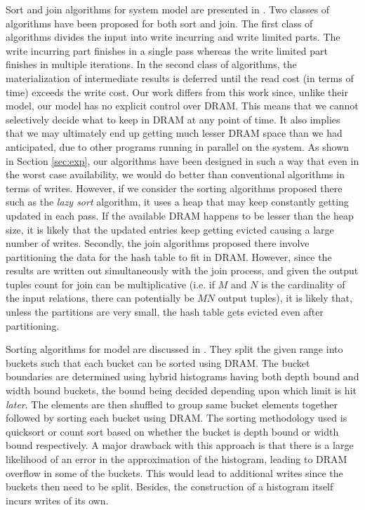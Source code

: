 Sort and join algorithms for system model \modelExplicit{} are presented in \cite{viglas}. Two classes of algorithms have been proposed for both sort and join. The first class of algorithms divides the input into write incurring and write limited parts. The write incurring part finishes in a single pass whereas the write limited part finishes in  multiple iterations. In the second class of algorithms, the materialization of intermediate results is deferred until the read cost (in terms of time) exceeds the write cost. Our work differs from this work since, unlike their model, our model has no explicit control over DRAM. This means that we cannot selectively decide what to keep in DRAM at any point of time. It also implies that we may ultimately end up getting much lesser DRAM space than we had anticipated, due to other programs running in parallel on the system. As shown in Section \ref{sec:exp}, our algorithms have been designed in such a way that even in the worst case availability, we would do better than conventional algorithms in terms of writes. However, if we consider the sorting algorithms proposed there such as the \textit{lazy sort} algorithm, it uses a heap that may keep constantly getting updated in each pass. If the available DRAM happens to be lesser than the heap size, it is likely that the updated entries keep getting evicted causing a large number of writes. Secondly, the join algorithms proposed there involve partitioning the data for the hash table to fit in DRAM. However, since the results are written out simultaneously with the join process, and given the output tuples count for join can be multiplicative (i.e. if $M$ and $N$ is the cardinality of the input relations, there can potentially be $MN$ output tuples), it is likely that, unless the partitions are very small, the hash table gets evicted even after partitioning. 

Sorting algorithms for \modelExplicit{} model are discussed in \cite{vamsi}. They split the given range into buckets such that each bucket can be sorted using DRAM. The bucket boundaries are determined using hybrid histograms having both depth bound and width bound buckets, the bound being decided depending upon which limit is hit \textit{later}. The elements are then shuffled to group same bucket elements together followed by sorting each bucket using DRAM. The sorting methodology used is quicksort or count sort based on whether the bucket is depth bound or width bound respectively. A major drawback with this approach is that there is a large likelihood of an error in the approximation of the histogram, leading to DRAM overflow in some of the buckets. This would lead to additional writes since the buckets then need to be split. Besides, the construction of a histogram itself incurs writes of its own.

